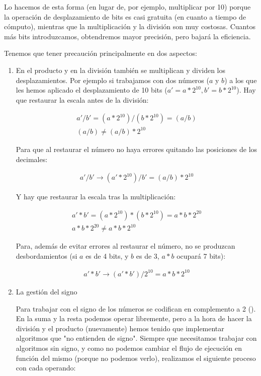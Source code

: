 
Lo hacemos de esta forma (en lugar de, por ejemplo, multiplicar por 10) porque la operación de desplazamiento de bits es casi gratuita (en cuanto a tiempo de cómputo), mientras que la multiplicación y la división son muy costosas. Cuantos más bits introduzcamos, obtendremos mayor precisión, pero bajará la eficiencia.

Tenemos que tener precaución principalmente en dos aspectos:

\begin{enumerate}

  \item En el producto y en la división también se multiplican y dividen los desplazamientos. Por ejemplo si trabajamos con dos números ($a$ y $b$) a los que les hemos aplicado el desplazamiento de 10 bits ($ a' = a * 2^{10}, b' = b * 2^{10} $). Hay que restaurar la escala antes de la división:

  \begin{gather}
    \label{form:float_bits_product}
    a' / b' = ( a * 2^{10} ) / ( b * 2^{10} ) = (a / b) \\
    (a / b) \neq (a / b) * 2^{10}
  \end{gather}

  Para que al restaurar el número no haya errores quitando las posiciones de los decimales:

  \begin{gather}
    a' / b' \rightarrow (a' * 2^{10})/b' = (a / b) * 2^{10}
  \end{gather}

  Y hay que restaurar la escala tras la multiplicación:

  \begin{gather}
    a' * b' = ( a * 2^{10} ) * ( b * 2^{10} ) = a * b * 2^{20} \\
    a * b * 2^{20} \neq a * b * 2^{10}
  \end{gather}

  Para, además de evitar errores al restaurar el número, no se produzcan desbordamientos (si $a$ es de 4 bits, y $b$ es de 3, $ a * b $ ocupará 7 bits):

  \begin{gather}
    a' * b' \rightarrow (a' * b') / 2^{10} = a * b * 2^{10}
  \end{gather}

  \item La gestión del signo

  Para trabajar con el signo de los números se codifican en complemento a 2 (\cite{wikipedia_contributors._complemento_2019}). En la suma y la resta podemos operar libremente, pero a la hora de hacer la división y el producto (nuevamente) hemos tenido que implementar algoritmos que "no entienden de signo".  Siempre que necesitamos trabajar con algoritmos sin signo, y como no podemos cambiar el flujo de ejecución en función del mismo (porque no podemos verlo), realizamos el siguiente proceso con cada operando:


\end{enumerate}
